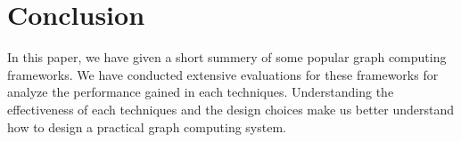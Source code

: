 \section{Conclusion}
In this paper, we have given a short summery of some popular graph computing
frameworks. We have conducted extensive evaluations for these frameworks
for analyze the performance gained in each techniques. Understanding
the effectiveness of each techniques and the design choices
make us better understand how to design a practical graph computing system.
 
